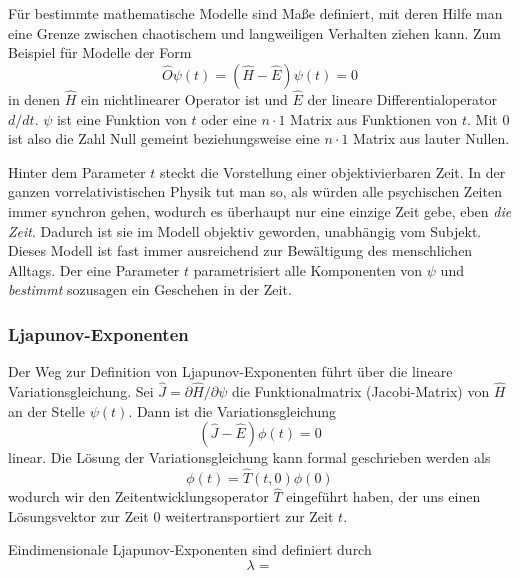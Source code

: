 \documentclass[12pt]{book}
\begin{document}
Für bestimmte mathematische Modelle sind Maße definiert, mit deren Hilfe man eine Grenze zwischen chaotischem und langweiligen Verhalten ziehen kann. Zum Beispiel für Modelle der Form
\begin{equation} 
\hat{O}\psi(t) = (\hat{H} - \hat{E}) \psi(t) = 0
\label{eq:nonlinear_equality}
\end{equation}
in denen $\hat{H}$ ein nichtlinearer Operator ist und $\hat{E}$ der lineare Differentialoperator $d/dt$. $\psi$ ist eine Funktion von $t$ oder eine $n \cdot 1$ Matrix aus Funktionen von $t$. Mit $0$ ist also die Zahl Null gemeint beziehungsweise eine $n \cdot 1$ Matrix aus lauter Nullen.

Hinter dem Parameter $t$ steckt die Vorstellung einer objektivierbaren Zeit. In der ganzen vorrelativistischen Physik tut man so, als würden alle psychischen Zeiten immer synchron gehen, wodurch es überhaupt nur eine einzige Zeit gebe, eben \emph{die Zeit}. Dadurch ist sie im Modell objektiv geworden, unabhängig vom Subjekt. Dieses Modell ist fast immer ausreichend zur Bewältigung des menschlichen Alltags. Der eine Parameter $t$ parametrisiert alle Komponenten von $\psi$ und \emph{bestimmt} sozusagen ein Geschehen in der Zeit.

\subsubsection{Ljapunov-Exponenten}

Der Weg zur Definition von Ljapunov-Exponenten führt über die lineare Variationsgleichung. Sei $\hat{J} = \partial \hat{H} / \partial \psi$ die Funktionalmatrix (Jacobi-Matrix) von $\hat{H}$ an der Stelle $\psi(t)$. Dann ist die Variationsgleichung
\begin{equation} 
(\hat{J} - \hat{E}) \phi(t) = 0
\label{eq:variation_equality}
\end{equation}
linear. Die Lösung der Variationsgleichung kann formal geschrieben werden als 
\begin{equation} 
\phi(t) = \hat{T}(t,0) \phi(0)
\label{eq:variation_equality}
\end{equation}
wodurch wir den Zeitentwicklungsoperator $\hat{T}$ eingeführt haben, der uns einen Lösungsvektor zur Zeit $0$ weitertransportiert zur Zeit $t$. 

Eindimensionale Ljapunov-Exponenten sind definiert durch 
\begin{equation} 
\lambda = 
\label{eq:ljapunov_exponent}
\end{equation}
\end{document}
